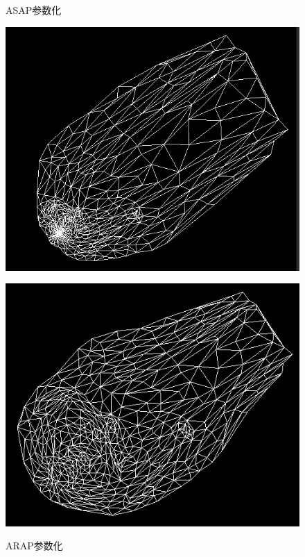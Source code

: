 \documentclass{article}
\begin{document}
\begin{figure}[htbp]
\begin{minipage}{0.24\linewidth}
			\label{chutian2}%
		\end{minipage}
		\begin{minipage}{0.24\linewidth}
			\centering
			\caption{ASAP参数化}
			\includegraphics[width=1\linewidth]{lsis_asap.JPG}
			\label{chutian2}%
		\end{minipage}
		\begin{minipage}{0.24\linewidth}
			\centering
			\caption{ARAP参数化}
			\includegraphics[width=1\linewidth]{lsis_arap.JPG}
			\label{chutian2}%
		\end{minipage}
	\end{figure}
\end{document}
